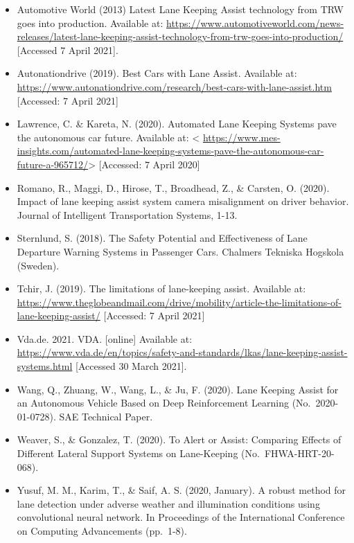\documentclass[
]{book}
\providecommand{\tightlist}{%
  \setlength{\itemsep}{0pt}\setlength{\parskip}{0pt}}
\begin{document}
\begin{itemize}
\tightlist
\item
  Automotive World (2013) Latest Lane Keeping Assist technology from TRW goes into production. Available at: \url{https://www.automotiveworld.com/news-releases/latest-lane-keeping-assist-technology-from-trw-goes-into-production/} {[}Accessed 7 April 2021{]}.
\item
  Autonationdrive (2019). Best Cars with Lane Assist. Available at: \url{https://www.autonationdrive.com/research/best-cars-with-lane-assist.htm} {[}Accessed: 7 April 2021{]}
\item
  Lawrence, C. \& Kareta, N. (2020). Automated Lane Keeping Systems pave the autonomous car future. Available at: \textless{} \url{https://www.mes-insights.com/automated-lane-keeping-systems-pave-the-autonomous-car-future-a-965712/}\textgreater{} {[}Accessed: 7 April 2020{]}
\item
  Romano, R., Maggi, D., Hirose, T., Broadhead, Z., \& Carsten, O. (2020). Impact of lane keeping assist system camera misalignment on driver behavior. Journal of Intelligent Transportation Systems, 1-13.
\item
  Sternlund, S. (2018). The Safety Potential and Effectiveness of Lane Departure Warning Systems in Passenger Cars. Chalmers Tekniska Hogskola (Sweden).
\item
  Tchir, J. (2019). The limitations of lane-keeping assist. Available at: \url{https://www.theglobeandmail.com/drive/mobility/article-the-limitations-of-lane-keeping-assist/} {[}Accessed: 7 April 2021{]}
\item
  Vda.de. 2021. VDA. {[}online{]} Available at: \url{https://www.vda.de/en/topics/safety-and-standards/lkas/lane-keeping-assist-systems.html} {[}Accessed 30 March 2021{]}.
\item
  Wang, Q., Zhuang, W., Wang, L., \& Ju, F. (2020). Lane Keeping Assist for an Autonomous Vehicle Based on Deep Reinforcement Learning (No.~2020-01-0728). SAE Technical Paper.
\item
  Weaver, S., \& Gonzalez, T. (2020). To Alert or Assist: Comparing Effects of Different Lateral Support Systems on Lane-Keeping (No.~FHWA-HRT-20-068).
\item
  Yusuf, M. M., Karim, T., \& Saif, A. S. (2020, January). A robust method for lane detection under adverse weather and illumination conditions using convolutional neural network. In Proceedings of the International Conference on Computing Advancements (pp.~1-8).
\end{itemize}
\end{document}
